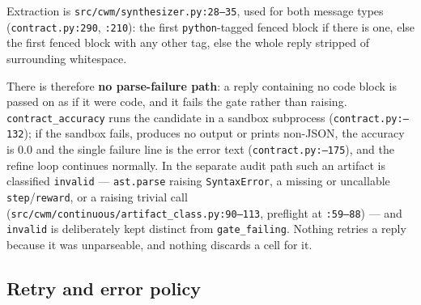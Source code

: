 Extraction is \texttt{src/\allowbreak cwm/\allowbreak synthesizer.\allowbreak py:28--35}, used for both message types
(\texttt{contract.py:290}, \texttt{:210}): the first \texttt{python}-tagged
fenced block if there is one, else the first fenced block with any other tag,
else the whole reply stripped of surrounding whitespace.

There is therefore \textbf{no parse-failure path}: a reply containing no code
block is passed on as if it were code, and it fails the gate rather than raising.
\texttt{contract\_\allowbreak accuracy} runs the candidate in a sandbox subprocess
(\texttt{contract.\allowbreak py:--132}); if the sandbox fails, produces no output or
prints non-JSON, the accuracy is $0.0$ and the single failure line is the error
text (\texttt{contract.\allowbreak py:--175}), and the refine loop continues normally. In
the separate audit path such an artifact is classified \texttt{invalid} ---
\texttt{ast.parse} raising \texttt{SyntaxError}, a missing or uncallable
\texttt{step}/\texttt{reward}, or a raising trivial call
(\texttt{src/\allowbreak cwm/\allowbreak continuous/\allowbreak artifact\_\allowbreak class.\allowbreak py:90--113}, preflight at
\texttt{:59--88}) --- and \texttt{invalid} is deliberately kept distinct from
\texttt{gate\_failing}. Nothing retries a reply because it was unparseable, and
nothing discards a cell for it.

\subsection{Retry and error policy}
\label{app:proto-retry}

